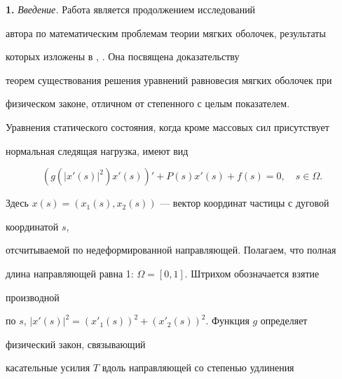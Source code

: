 \date{} 




\pagestyle{plain} %


 




\maketitle 


\label{begin} 


 


{\bf 1.} {\it Введение.} Работа является продолжением исследований 


автора по математическим проблемам теории мягких оболочек, результаты 


которых изложены в \cite{1}, \cite{2}. Она посвящена доказательству 


теорем существования решения уравнений равновесия мягких оболочек при 


физическом законе, отличном от степенного с целым показателем. 


 


Уравнения статического состояния, когда кроме массовых сил присутствует 


нормальная следящая нагрузка, имеют вид 


\begin{equation} 


(g(|x'(s)|^2)x'(s))'+P(s)x'(s)+f(s)=0,\quad s\in\Omega. 


\end{equation} 


Здесь $x(s)=(x_1(s),x_2(s))$ --- вектор координат частицы с дуговой 


координатой $s$, 


отсчитываемой по недеформированной направляющей. Полагаем, что полная 


длина направляющей равна 1: $\Omega=[0,1]$. Штрихом обозначается взятие 


производной 


по $s$, $|x'(s)|^2=(x'_1(s))^2+(x'_2(s))^2$. Функция $g$ определяет 


физический закон, связывающий 


касательные усилия $T$ вдоль направляющей со степенью удлинения 



